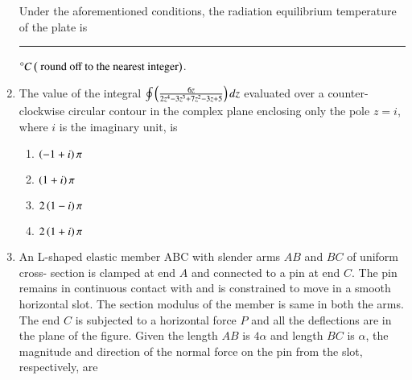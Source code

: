 \documentclass[journal]{IEEEtran}
\begin{document}
\begin{enumerate}
{Under the aforementioned conditions, the radiation equilibrium temperature of the plate is \rule{2cm}{0.15mm}$\degree C\left(\text{ round off to the nearest integer}\right)$.\\
}
\item{
The value of the integral $\oint\left(\frac{6z}{2z^4-3z^3+7z^2-3z+5}\right)dz$ evaluated over a counter-clockwise circular contour in the complex plane enclosing only the pole $z=i$, where $i$ is the imaginary unit, is
\begin{multicols}{4}
\begin{enumerate}
\item $\left(-1+i\right)\pi$
\item $\left(1+i\right)\pi$
\item $2\left(1-i\right)\pi$ 
\item $2\left(1+i\right)\pi$
\end{enumerate}
\end{multicols}
}
\item{
An L-shaped elastic member ABC with slender arms $AB$ and $BC$ of uniform cross- section is clamped at end $A$ and connected to a pin at end $C$. The pin remains in continuous contact with and is constrained to move in a smooth horizontal slot. The section modulus of the member is same in both the arms. The end $C$ is subjected to a horizontal force $P$ and all the deflections are in the plane of the figure. Given the length $AB$ is $4\alpha$ and length $BC$ is $\alpha$, the magnitude and direction of the normal force on the pin from the slot, respectively, are
\begin{figure}[H]
\centering
{}%


\end{figure}}
\end{enumerate}
\end{document}
